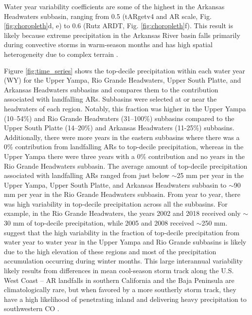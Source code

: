 \documentclass[draft]{agujournal2019}
\begin{document}
Water year variability coefficients are some of the highest in the Arkansas Headwaters subbasin, ranging from 0.5 (tARgetv4 and AR scale, Fig. \ref{fig:choropleth}d, e) to 0.6 (Rutz ARDT, Fig. \ref{fig:choropleth}f). This result is likely because extreme precipitation in the Arkansas River basin falls primarily during convective storms in warm-season months and has high spatial heterogeneity due to complex terrain \cite{Javier2007ClimatologyBasin}.

Figure \ref{fig:time_series} shows the top-decile precipitation within each water year (WY) for the Upper Yampa, Rio Grande Headwaters, Upper South Platte, and Arkansas Headwaters subbasins and compares them to the contribution associated with landfalling ARs. Subbasins were selected at or near the headwaters of each region. Notably, this fraction was higher in the Upper Yampa (10--54\%) and Rio Grande Headwaters (31--100\%) subbasins compared to the Upper South Platte (14--20\%) and Arkansas Headwaters (11-25\%) subbasins. Additionally, there were more years in the eastern subbasins where there was a 0\% contribution from landfalling ARs to top-decile precipitation, whereas in the Upper Yampa there were three years with a 0\% contribution and no years in the Rio Grande Headwaters subbasin. The average amount of top-decile precipitation associated with landfalling ARs ranged from just below  $\sim$25 mm per year in the Upper Yampa, Upper South Platte, and Arkansas Headwaters subbasin to $\sim$90 mm per year in the Rio Grande Headwaters subbasin. From year to year, there was high variability in top-decile precipitation across all the subbasins. For example, in the Rio Grande Headwaters, the years 2002 and 2018 received only  $\sim$30 mm of top-decile precipitation, while 2005 and 2008 received  $\sim$250 mm.  suggest that the high variability in the fraction of top-decile precipitation from water year to water year in the Upper Yampa and Rio Grande subbasins is likely due to the high elevation of these regions and most of the precipitation accumulation occurring during winter months. This large interannual variability likely results from differences in mean cool-season storm track along the U.S. West Coast – AR landfalls in southern California and the Baja Peninsula are climatologically rare, but when favored by a more southerly storm track, they have a high likelihood of penetrating inland and delivering heavy precipitation to southwestern CO \cite{Rutz2014, Rutz2015}.
\end{document}
